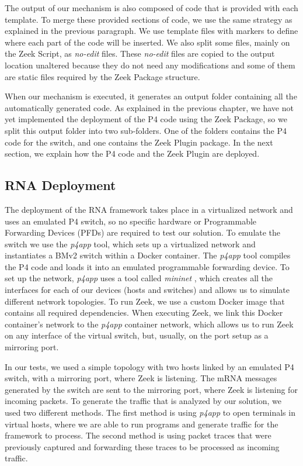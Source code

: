 The output of our mechanism is also composed of code that is provided with each template. To merge these provided sections of code, we use the same strategy as explained in the previous paragraph. We use template files with markers to define where each part of the code will be inserted. We also split some files, mainly on the Zeek Script, as \textit{no-edit} files. These \textit{no-edit} files are copied to the output location unaltered because they do not need any modifications and some of them are static files required by the Zeek Package structure.

When our mechanism is executed, it generates an output folder containing all the automatically generated code. As explained in the previous chapter, we have not yet implemented the deployment of the P4 code using the Zeek Package, so we split this output folder into two sub-folders. One of the folders contains the P4 code for the switch, and one contains the Zeek Plugin package. In the next section, we explain how the P4 code and the Zeek Plugin are deployed.

\subsection{RNA Deployment}
\label{sec:evaluation:deployment}

The deployment of the RNA framework takes place in a virtualized network and uses an emulated P4 switch, so no specific hardware or Programmable Forwarding Devices (PFDs) are required to test our solution. To emulate the switch we use the \textit{p4app} tool, which sets up a virtualized network and instantiates a BMv2 switch \cite{BMv2} within a Docker container. The \textit{p4app} tool \cite{P4App} compiles the P4 code and loads it into an emulated programmable forwarding device. To set up the network, \textit{p4app} uses a tool called \textit{mininet} \cite{Mininet}, which creates all the interfaces for each of our devices (hosts and switches) and allows us to simulate different network topologies. To run Zeek, we use a custom Docker image that contains all required dependencies. When executing Zeek, we link this Docker container's network to the \textit{p4app} container network, which allows us to run Zeek on any interface of the virtual switch, but, usually, on the port setup as a mirroring port.

In our tests, we used a simple topology with two hosts linked by an emulated P4 switch, with a mirroring port, where Zeek is listening. The mRNA messages generated by the switch are sent to the mirroring port, where Zeek is listening for incoming packets. To generate the traffic that is analyzed by our solution, we used two different methods. The first method is using \textit{p4app} to open terminals in virtual hosts, where we are able to run programs and generate traffic for the framework to process. The second method is using packet traces that were previously captured and forwarding these traces to be processed as incoming traffic.

